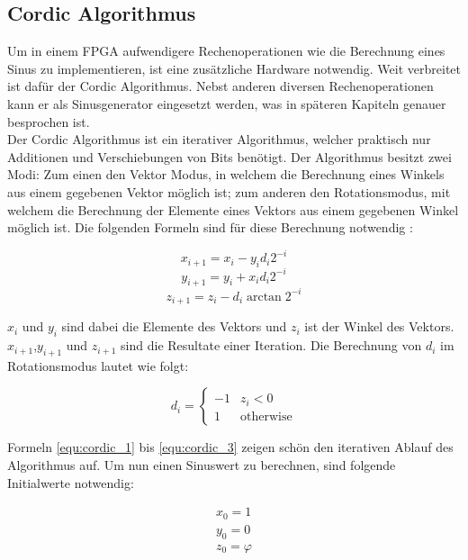 \subsection{Cordic Algorithmus}\label{subsec:Cordic}

Um in einem FPGA aufwendigere Rechenoperationen wie die Berechnung eines Sinus zu implementieren, ist eine zusätzliche Hardware notwendig. Weit verbreitet ist dafür der Cordic Algorithmus. Nebst anderen diversen Rechenoperationen kann er als Sinusgenerator eingesetzt werden, was in späteren Kapiteln genauer besprochen ist. \\
Der Cordic Algorithmus ist ein iterativer Algorithmus, welcher praktisch nur Additionen und Verschiebungen von Bits benötigt. 
Der Algorithmus besitzt zwei Modi: Zum einen den Vektor Modus, in welchem die Berechnung eines Winkels aus einem gegebenen Vektor möglich ist; zum anderen den Rotationsmodus, mit welchem die Berechnung der Elemente eines Vektors aus einem gegebenen Winkel möglich ist. Die folgenden Formeln sind für diese Berechnung notwendig \cite{Cordic}:

\begin{equation}
x_{i+1} = x_i - y_id_i2^{-i}
\label{equ:cordic_1}
\end{equation} 
\begin{equation}
y_{i+1} = y_i + x_id_i2^{-i}
\label{equ:cordic_2}
\end{equation} 
\begin{equation}
z_{i+1} = z_i - d_i\arctan{2^{-i}}
\label{equ:cordic_3}
\end{equation} 

\(x_i\) und \(y_i\) sind dabei die Elemente des Vektors und \(z_i\) ist der Winkel des Vektors. \(x_{i+1}\),\(y_{i+1}\) und \(z_{i+1}\) sind die Resultate einer Iteration.
Die Berechnung von \(d_i\) im Rotationsmodus lautet wie folgt: 

\begin{equation}
d_i=
\begin{cases}
-1 &z_i < 0 \\
1 &\text{otherwise}
\end{cases}
\label{equ:cordic_4}
\end{equation} 

Formeln \ref{equ:cordic_1} bis \ref{equ:cordic_3} zeigen schön den iterativen Ablauf des Algorithmus auf. Um nun einen Sinuswert zu berechnen, sind folgende Initialwerte notwendig:

\begin{equation}
\begin{aligned}
x_0 = 1 \\
y_0 = 0 \\
z_0 = \varphi
\end{aligned}
\label{equ:cordic_5}
\end{equation} 

